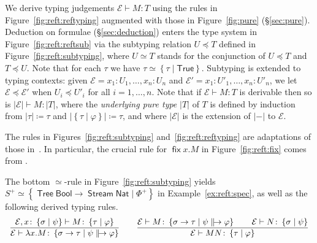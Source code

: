 \documentclass[%
  a4paper,
  UKenglish,
  cleveref,
  autoref,
  thm-restate,
  numberwithinsect,
]{lipics-v2021}
\newcommand\deq\coloneqq
\newcommand\pl{\mathord{-}}	%
\newcommand\thesis{\vdash}
\newcommand\temp[1]{\mathsf{#1}}
\newcommand\True{\temp{True}}
\newcommand\Env{\mathcal{E}}    %
\newcommand\term[1]{\mathsf{#1}}
\newcommand\type[1]{\term{#1}}
\newcommand\fix{\mathop{\term{fix}}}
\newcommand\arrow\to
\newcommand\subtype\preceq
\newcommand\eqtype\simeq
\newcommand\Bool{\type{Bool}}
\newcommand\Nat{\type{Nat}}
\newcommand\Stream{\mathop{\type{Stream}}}
\newcommand\Tree{\mathop{\type{Tree}}}
\newcommand\reft[1]{\left\{ #1 \right\}}
\newcommand\defrealto{\mathrel\parallel\joinrel\to}
\newcommand\realto{\mathrel{\defrealto}}
\newcommand\PT{\tau}		%
\newcommand\PTbis{\sigma}	%
\newcommand\RT{T}               %
\newcommand\RTbis{U}            %
\newcommand\UPT[1]{\vert #1 \vert}        %
\begin{document}
We derive typing judgements $\Env \thesis M \colon \RT$
using the rules in Figure~\ref{fig:reft:reftyping}
augmented with those in Figure~\ref{fig:pure} (\S\ref{sec:pure}).
Deduction on formulae (\S\ref{sec:deduction})
enters the type system in Figure~\ref{fig:reft:reftsub}
via the subtyping relation $\RTbis \subtype \RT$
defined in Figure~\ref{fig:reft:subtyping},
where $\RTbis \eqtype \RT$
stands for the conjunction of $\RTbis \subtype \RT$ and $\RT \subtype \RTbis$.
Note that for each $\PT$ we have $\PT \eqtype \reft{\PT \mid \True}$.
%
Subtyping is extended to typing contexts:
given $\Env = x_1 \colon \RTbis_1,\dots,x_n \colon\RTbis_n$
and $\Env' = x_1 \colon \RTbis'_1,\dots,x_n \colon \RTbis'_n$,
we let $\Env \subtype \Env'$ when $\RTbis_i \subtype \RTbis'_i$
for all $i =1,\dots,n$.
%
Note that if $\Env \thesis M \colon \RT$ is derivable
then so is $\UPT\Env \thesis M \colon \UPT\RT$,
where the \emph{underlying pure type} $\UPT\RT$ of $\RT$
is defined by induction from $\UPT\PT \deq \PT$
and $\UPT{\reft{\PT \mid \varphi}} \deq \PT$,
and where $\UPT\Env$ is the extension of $\UPT{\pl}$ to $\Env$.




The rules in Figures~\ref{fig:reft:subtyping} and~\ref{fig:reft:reftyping}
are adaptations of those in~\cite{abramsky91apal,bk03ic,jr21esop,rk25wollic}.
In particular, the crucial rule for $\fix x.M$ in Figure~\ref{fig:reft:fix}
comes from \cite{abramsky91apal}.

\begin{example}
The bottom $\eqtype$-rule in Figure~\ref{fig:reft:subtyping} yields
$S^+ \eqtype \reft{\Tree\Bool \arrow \Stream\Nat \mid \Phi^+}$
in Example~\ref{ex:reft:spec},
as well as the following derived typing rules.
\[
\begin{array}{c}
%
\dfrac{\Env,x \colon \reft{\PTbis \mid \psi} \thesis M \colon \reft{\PT \mid \varphi}}
  {\Env \thesis \lambda x.M \colon \reft{\PTbis \arrow \PT \mid \psi \realto \varphi}}
%
\qquad
%
\dfrac{\Env \thesis M \colon \reft{\PTbis \arrow \PT \mid \psi \realto \varphi}
  \qquad
  \Env \thesis N \colon \reft{\PTbis \mid \psi}}
  {\Env \thesis M N \colon \reft{\PT \mid \varphi}}
%
\end{array}
\]
\end{example}
\end{document}
